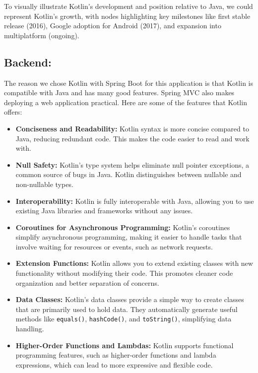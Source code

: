 To visually illustrate Kotlin’s development and position relative to Java, we could represent Kotlin’s growth, with nodes highlighting key milestones like first stable release (2016), Google adoption for Android (2017), and expansion into multiplatform (ongoing).


\subsection{Backend:}

The reason we chose Kotlin with Spring Boot for this application is that Kotlin is compatible with Java and has many good features. Spring MVC also makes deploying a web application practical. Here are some of the features that Kotlin offers:

\begin{itemize}
    \item \textbf{Conciseness and Readability:} Kotlin syntax is more concise compared to Java, reducing redundant code. This makes the code easier to read and work with.
    
    \item \textbf{Null Safety:} Kotlin's type system helps eliminate null pointer exceptions, a common source of bugs in Java. Kotlin distinguishes between nullable and non-nullable types.
    
    \item \textbf{Interoperability:} Kotlin is fully interoperable with Java, allowing you to use existing Java libraries and frameworks without any issues.
    
    \item \textbf{Coroutines for Asynchronous Programming:} Kotlin's coroutines simplify asynchronous programming, making it easier to handle tasks that involve waiting for resources or events, such as network requests.
    
    \item \textbf{Extension Functions:} Kotlin allows you to extend existing classes with new functionality without modifying their code. This promotes cleaner code organization and better separation of concerns.
    
    \item \textbf{Data Classes:} Kotlin's data classes provide a simple way to create classes that are primarily used to hold data. They automatically generate useful methods like \texttt{equals()}, \texttt{hashCode()}, and \texttt{toString()}, simplifying data handling.
    
    \item \textbf{Higher-Order Functions and Lambdas:} Kotlin supports functional programming features, such as higher-order functions and lambda expressions, which can lead to more expressive and flexible code.
\end{itemize}


